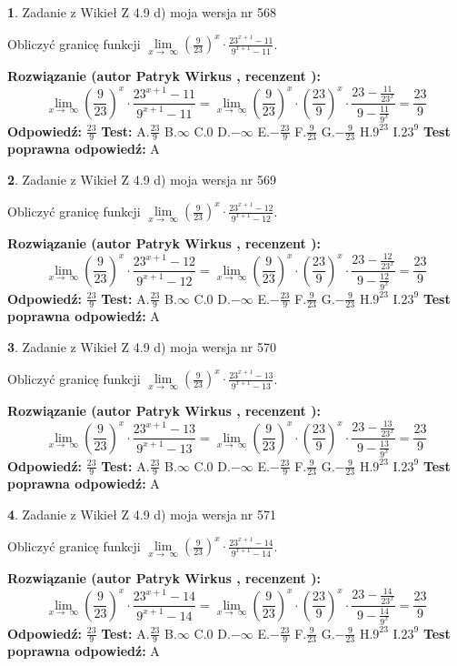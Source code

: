 \documentclass[12pt, a4paper]{article}
\theoremstyle{definition} %
\newtheorem{zad}{}
\newcommand{\zadStart}[1]{\begin{zad}#1\newline}
\newcommand{\zadStop}{\end{zad}}
\newcommand{\rozwStart}[2]{\noindent \textbf{Rozwiązanie (autor #1 , recenzent #2): }\newline}
\newcommand{\rozwStop}{\newline}
\newcommand{\odpStart}{\noindent \textbf{Odpowiedź:}\newline}
\newcommand{\odpStop}{\newline}
\newcommand{\testStart}{\noindent \textbf{Test:}\newline}
\newcommand{\testStop}{\newline}
\newcommand{\kluczStart}{\noindent \textbf{Test poprawna odpowiedź:}\newline}
\newcommand{\kluczStop}{\newline}
\begin{document}
\zadStart{Zadanie z Wikieł Z 4.9 d) moja wersja nr 568}


Obliczyć granicę funkcji  $\lim\limits_{x\to\ \infty}(\frac{9}{23})^{x}\cdot\frac{23^{x+1}-11}{9^{x+1}-11}$.
\zadStop
\rozwStart{Patryk Wirkus}{}
$$\lim\limits_{x\to\ \infty}(\frac{9}{23})^{x}\cdot\frac{23^{x+1}-11}{9^{x+1}-11}=\lim\limits_{x\to\ \infty}(\frac{9}{23})^{x}\cdot(\frac{23}{9})^{x} \cdot \frac{23-\frac{11}{23^{x}}}{9-\frac{11}{9^{x}}} = \frac{23}{9}$$
\rozwStop
\odpStart
$\frac{23}{9}$
\odpStop
\testStart
A.$\frac{23}{9}$ B.$\infty$ C.$0$ D.$-\infty$ E.$-\frac{23}{9}$
F.$\frac{9}{23}$ G.$-\frac{9}{23}$
H.$9^{23}$
I.$23^{9}$
\testStop
\kluczStart
A
\kluczStop



\zadStart{Zadanie z Wikieł Z 4.9 d) moja wersja nr 569}


Obliczyć granicę funkcji  $\lim\limits_{x\to\ \infty}(\frac{9}{23})^{x}\cdot\frac{23^{x+1}-12}{9^{x+1}-12}$.
\zadStop
\rozwStart{Patryk Wirkus}{}
$$\lim\limits_{x\to\ \infty}(\frac{9}{23})^{x}\cdot\frac{23^{x+1}-12}{9^{x+1}-12}=\lim\limits_{x\to\ \infty}(\frac{9}{23})^{x}\cdot(\frac{23}{9})^{x} \cdot \frac{23-\frac{12}{23^{x}}}{9-\frac{12}{9^{x}}} = \frac{23}{9}$$
\rozwStop
\odpStart
$\frac{23}{9}$
\odpStop
\testStart
A.$\frac{23}{9}$ B.$\infty$ C.$0$ D.$-\infty$ E.$-\frac{23}{9}$
F.$\frac{9}{23}$ G.$-\frac{9}{23}$
H.$9^{23}$
I.$23^{9}$
\testStop
\kluczStart
A
\kluczStop



\zadStart{Zadanie z Wikieł Z 4.9 d) moja wersja nr 570}


Obliczyć granicę funkcji  $\lim\limits_{x\to\ \infty}(\frac{9}{23})^{x}\cdot\frac{23^{x+1}-13}{9^{x+1}-13}$.
\zadStop
\rozwStart{Patryk Wirkus}{}
$$\lim\limits_{x\to\ \infty}(\frac{9}{23})^{x}\cdot\frac{23^{x+1}-13}{9^{x+1}-13}=\lim\limits_{x\to\ \infty}(\frac{9}{23})^{x}\cdot(\frac{23}{9})^{x} \cdot \frac{23-\frac{13}{23^{x}}}{9-\frac{13}{9^{x}}} = \frac{23}{9}$$
\rozwStop
\odpStart
$\frac{23}{9}$
\odpStop
\testStart
A.$\frac{23}{9}$ B.$\infty$ C.$0$ D.$-\infty$ E.$-\frac{23}{9}$
F.$\frac{9}{23}$ G.$-\frac{9}{23}$
H.$9^{23}$
I.$23^{9}$
\testStop
\kluczStart
A
\kluczStop



\zadStart{Zadanie z Wikieł Z 4.9 d) moja wersja nr 571}


Obliczyć granicę funkcji  $\lim\limits_{x\to\ \infty}(\frac{9}{23})^{x}\cdot\frac{23^{x+1}-14}{9^{x+1}-14}$.
\zadStop
\rozwStart{Patryk Wirkus}{}
$$\lim\limits_{x\to\ \infty}(\frac{9}{23})^{x}\cdot\frac{23^{x+1}-14}{9^{x+1}-14}=\lim\limits_{x\to\ \infty}(\frac{9}{23})^{x}\cdot(\frac{23}{9})^{x} \cdot \frac{23-\frac{14}{23^{x}}}{9-\frac{14}{9^{x}}} = \frac{23}{9}$$
\rozwStop
\odpStart
$\frac{23}{9}$
\odpStop
\testStart
A.$\frac{23}{9}$ B.$\infty$ C.$0$ D.$-\infty$ E.$-\frac{23}{9}$
F.$\frac{9}{23}$ G.$-\frac{9}{23}$
H.$9^{23}$
I.$23^{9}$
\testStop
\kluczStart
A
\kluczStop
\end{document}
